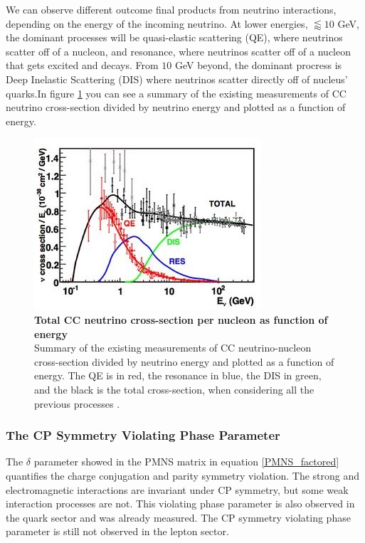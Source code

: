 We can observe different outcome final products from neutrino interactions, depending on the energy of the incoming neutrino. At lower energies, $\lessapprox 10$ GeV, the dominant processes will be quasi-elastic scattering (QE), where neutrinos scatter off of a nucleon, and resonance, where neutrinos scatter off of a nucleon that gets excited and decays. From $10$ GeV beyond, the dominant procress is Deep Inelastic Scattering (DIS) where neutrinos scatter directly off of nucleus' quarks.In figure \ref{nu_scatter} you can see a summary of the existing measurements of CC neutrino cross-section divided by neutrino energy and plotted as a function of energy. 

\begin{figure}[h!]
	\begin{center}
		\includegraphics[scale=0.9]{Figures/nu_scatter.jpg}
		\caption[Total CC neutrino cross-section per nucleon as function of energy]{ {\textbf{Total CC neutrino cross-section per nucleon as function of energy}} \\ Summary of the existing measurements of CC neutrino-nucleon cross-section divided by neutrino energy and plotted as a function of energy. The QE is in red, the resonance in blue, the DIS in green, and the black is the total cross-section, when considering all the previous processes \cite{nu_scatter_zeller}.}
		\label{nu_scatter}	
	\end{center}
\end{figure}



\subsubsection{The CP Symmetry Violating Phase Parameter}

The $\delta$ parameter showed in the PMNS matrix in equation \ref{PMNS_factored} quantifies the charge conjugation and parity symmetry violation. The strong and electromagnetic interactions are invariant under CP symmetry, but some weak interaction processes are not. This violating phase parameter is also observed in the quark sector and was already measured. The CP symmetry violating phase parameter is still not observed in the lepton sector.

